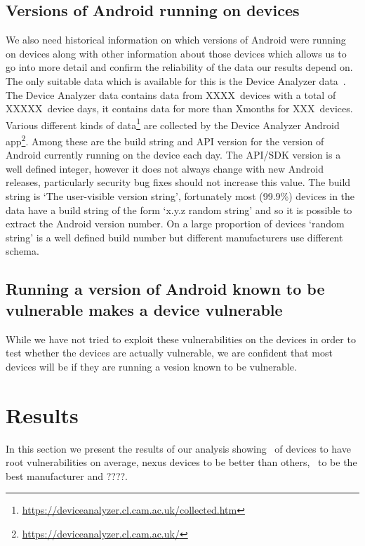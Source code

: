 \documentclass[conference,a4paper,twoside]{IEEEtran}
\newcommand{\daNumDevices}{XXXX}
\newcommand{\daDeviceDays}{XXXXX}
\newcommand{\daMonths}{X}%
\newcommand{\daMonthsDevices}{XXX}
\begin{document}
\subsection{Versions of Android running on devices}
We also need historical information on which versions of Android were running on devices along with other information about those devices which allows us to go into more detail and confirm the reliability of the data our results depend on.
The only suitable data which is available for this is the Device Analyzer data~\cite{Wagner2013}.
The Device Analyzer data contains data from \daNumDevices\ devices with a total of \daDeviceDays\ device days, it contains data for more than \daMonths months for \daMonthsDevices\ devices.
Various different kinds of data\footnote{\url{https://deviceanalyzer.cl.cam.ac.uk/collected.htm}} are collected by the Device Analyzer Android app\footnote{\url{https://deviceanalyzer.cl.cam.ac.uk/}}.
Among these are the build string and API version for the version of Android currently running on the device each day.
The API/SDK version is a well defined integer, however it does not always change with new Android releases, particularly security bug fixes should not increase this value.
The build string is `The user-visible version string', fortunately most (99.9\%) devices in the data have a build string of the form `x.y.z random string' and so it is possible to extract the Android version number.
On a large proportion of devices `random string' is a well defined build number but different manufacturers use different schema.

\subsection{Running a version of Android known to be vulnerable makes a device vulnerable}
While we have not tried to exploit these vulnerabilities on the devices in order to test whether the devices are actually vulnerable, we are confident that most devices will be if they are running a vesion known to be vulnerable.

\section{Results}
\label{sec:results}
In this section we present the results of our analysis showing \daMeanInsecurityPerc\ of devices to have root vulnerabilities on average, nexus devices to be better than others, \daSecScoreBestmanufacturer\ to be the best manufacturer and ????. %
\end{document}
